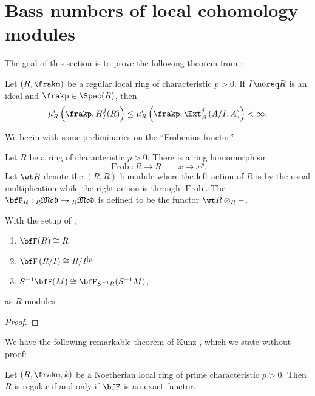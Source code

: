 \section{Bass numbers of local cohomology modules}

The goal of this section is to prove the following theorem from \cite{huneke-sharp}:

\begin{theorem}
	Let $(R,\frakm)$ be a regular local ring of characteristic $p > 0$. If $I\noreq R$ is an ideal and $\frakp\in\Spec(R)$, then 
	\begin{equation*}
		\mu^i_R\left(\frakp, H^j_I(R)\right)\le\mu^i_R\left(\frakp,\Ext^j_A\left(A/I, A\right)\right) < \infty.
	\end{equation*}
\end{theorem}

We begin with some preliminaries on the ``Frobenius functor''.

\begin{definition}
	Let $R$ be a ring of characteristic $p > 0$. There is a ring homomorphism
	\begin{equation*}
		\operatorname{Frob}: R\to R\qquad x\mapsto x^p.
	\end{equation*}
	Let $\wt R$ denote the $(R, R)$-bimodule where the left action of $R$ is by the usual multiplication while the right action is through $\operatorname{Frob}$. The  $\bfF_R: {}_R\mathfrak{Mod}\to{}_R\mathfrak{Mod}$ is defined to be the functor $\wt R\otimes_R -$.
\end{definition}

\begin{proposition}
	With the setup of , 
	\begin{enumerate}[label=(\arabic*)]
		\item $\bfF(R)\cong R$
		\item $\bfF\left(R/I\right)\cong R/I^{[p]}$
		\item $S^{-1}\bfF(M)\cong\bfF_{S^{-1}R}(S^{-1}M)$,
	\end{enumerate}
	as $R$-modules.
\end{proposition}
\begin{proof}
	
\end{proof}

We have the following remarkable theorem of Kunz \cite{kunz-regular-local}, which we state without proof:
\begin{theorem}[Kunz, 1969]
	Let $(R,\frakm, k)$ be a Noetherian local ring of prime characteristic $p > 0$. Then $R$ is regular if and only if $\bfF$ is an exact functor.
\end{theorem}

